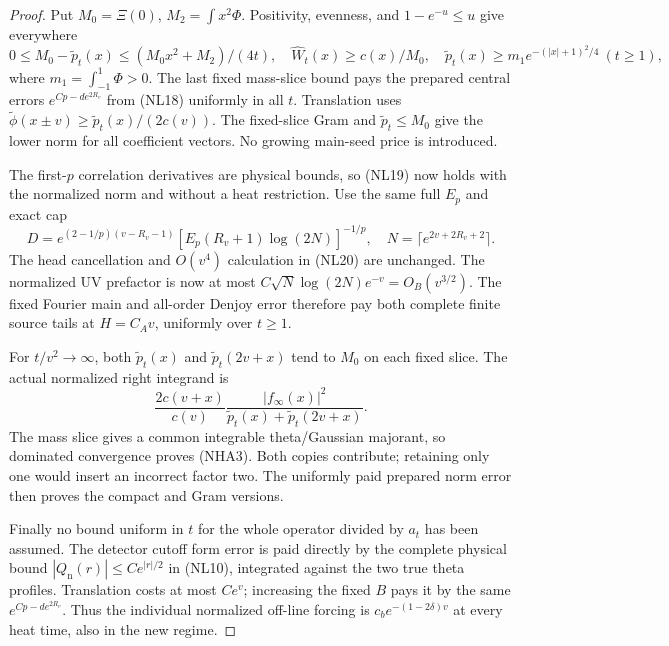\documentclass[11pt]{article}
\theoremstyle{remark}\newtheorem{remark}[theorem]{Remark}
\begin{document}
\begin{proof}
Put \(M_0=\Xi(0)\), \(M_2=\int x^2\Phi\).
Positivity, evenness, and \(1-e^{-u}\le u\) give everywhere
\[
 0\le M_0-\widetilde p_t(x)\le(M_0x^2+M_2)/(4t),\quad
 \widehat W_t(x)\ge c(x)/M_0,\quad
 \widetilde p_t(x)\ge m_1e^{-(|x|+1)^2/4}\ (t\ge1),            \tag{NHA4}
\]
where \(m_1=\int_{-1}^1\Phi>0\).
The last fixed mass-slice bound pays the prepared central errors
\(e^{Cp-d e^{2R_v}}\) from (NL18) uniformly in all \(t\).
Translation uses
\(\widetilde\phi(x\pm v)\ge\widetilde p_t(x)/(2c(v))\).
The fixed-slice Gram and \(\widetilde p_t\le M_0\) give the
lower norm for all coefficient vectors. No growing main-seed
price is introduced.

The first-\(p\) correlation derivatives are physical bounds,
so (NL19) now holds with the normalized norm and without a
heat restriction. Use the same full \(E_p\) and exact cap
\[
 D=e^{(2-1/p)(v-R_v-1)}
        [E_p(R_v+1)\log(2N)]^{-1/p},\quad
                 N=\lceil e^{2v+2R_v+2}\rceil .
\]
The head cancellation and \(O(v^4)\) calculation in (NL20)
are unchanged. The normalized UV prefactor is now at most
\(C\sqrt N\log(2N)e^{-v}=O_B(v^{3/2})\).
The fixed Fourier main and all-order Denjoy error therefore
pay both complete finite source tails at \(H=C_Av\),
uniformly over \(t\ge1\).

For \(t/v^2\to\infty\), both
\(\widetilde p_t(x)\) and \(\widetilde p_t(2v+x)\) tend to
\(M_0\) on each fixed slice. The actual normalized right
integrand is
\[
 \frac{2c(v+x)}{c(v)}
   \frac{|f_\infty(x)|^2}
        {\widetilde p_t(x)+\widetilde p_t(2v+x)} .
\]
The mass slice gives a common integrable theta/Gaussian
majorant, so dominated convergence proves (NHA3).
Both copies contribute; retaining only one would insert an
incorrect factor two. The uniformly paid prepared norm error
then proves the compact and Gram versions.

Finally no bound uniform in \(t\) for the whole operator
divided by \(a_t\) has been assumed. The detector cutoff
form error is paid directly by the complete physical bound
\(|Q_{\mathrm n}(r)|\le Ce^{|r|/2}\) in (NL10), integrated
against the two true theta profiles. Translation costs at
most \(Ce^v\); increasing the fixed \(B\) pays it by the
same \(e^{Cp-d e^{2R_v}}\). Thus the individual normalized
off-line forcing is \(c_be^{-(1-2\delta)v}\) at every
heat time, also in the new regime.
\end{proof}
\end{document}
